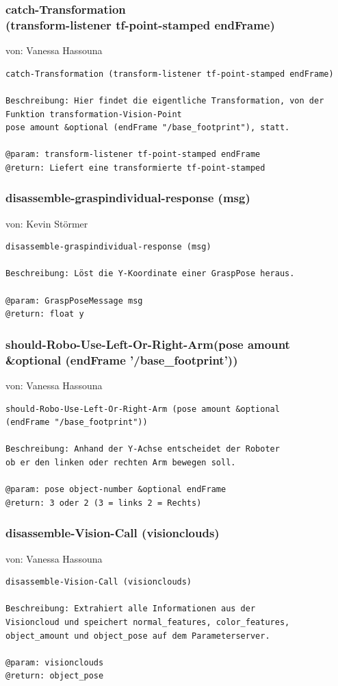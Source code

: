 \documentclass{suturo}
\makeatletter
\newcommand{\chapterauthor}[1]{%
  {\parindent0pt\vspace*{-27pt}%
  \linespread{0}\small\begin{flushright}von: #1\end{flushright}%
  \par\nobreak\vspace*{0pt}}
  \@afterheading%
}
\makeatother
\begin{document}
\subsubsection{catch-Transformation \\
(transform-listener tf-point-stamped endFrame)}
\chapterauthor{Vanessa Hassouna}
\begin{verbatim}
catch-Transformation (transform-listener tf-point-stamped endFrame)

Beschreibung: Hier findet die eigentliche Transformation, von der
Funktion transformation-Vision-Point 
pose amount &optional (endFrame "/base_footprint"), statt.

@param: transform-listener tf-point-stamped endFrame
@return: Liefert eine transformierte tf-point-stamped
\end{verbatim}

\subsubsection{disassemble-graspindividual-response (msg)}
\chapterauthor{Kevin Störmer}
\begin{verbatim}
disassemble-graspindividual-response (msg)

Beschreibung: Löst die Y-Koordinate einer GraspPose heraus.

@param: GraspPoseMessage msg
@return: float y
\end{verbatim}



\subsubsection{should-Robo-Use-Left-Or-Right-Arm(pose amount \\
\&optional (endFrame '/base\_footprint'))}
\chapterauthor{Vanessa Hassouna}
\begin{verbatim}
should-Robo-Use-Left-Or-Right-Arm (pose amount &optional
(endFrame "/base_footprint"))

Beschreibung: Anhand der Y-Achse entscheidet der Roboter
ob er den linken oder rechten Arm bewegen soll.

@param: pose object-number &optional endFrame
@return: 3 oder 2 (3 = links 2 = Rechts)
\end{verbatim}


\subsubsection{disassemble-Vision-Call (visionclouds)}
\chapterauthor{Vanessa Hassouna}
\begin{verbatim}
disassemble-Vision-Call (visionclouds)

Beschreibung: Extrahiert alle Informationen aus der 
Visioncloud und speichert normal_features, color_features, 
object_amount und object_pose auf dem Parameterserver.
 
@param: visionclouds
@return: object_pose
\end{verbatim}
\end{document}
